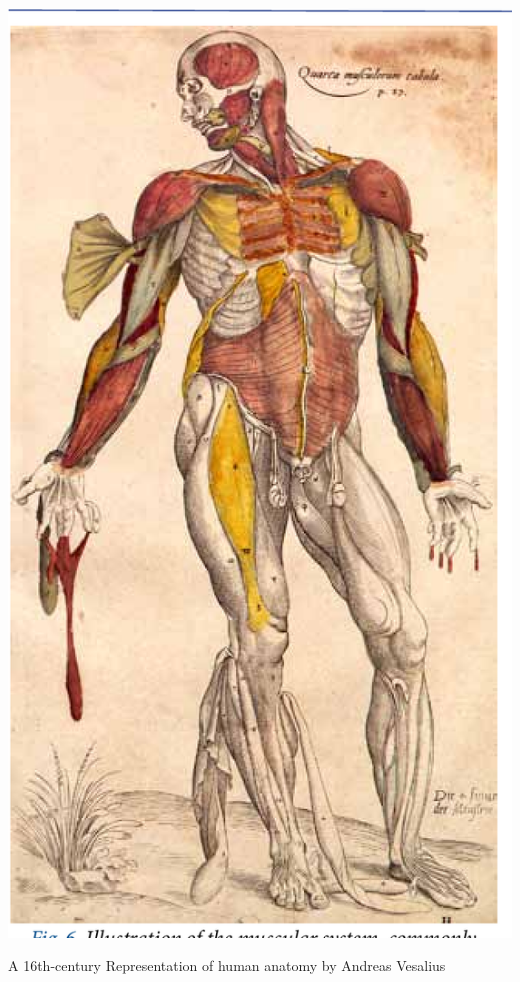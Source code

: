 \begin{marginfigure}[-5.5cm]
	\includegraphics{YOURNAME/images/fig 1.2.png}
	\caption[]{A 16th-century Representation of human anatomy by Andreas Vesalius}
	\labfig{}
\end{marginfigure} 

